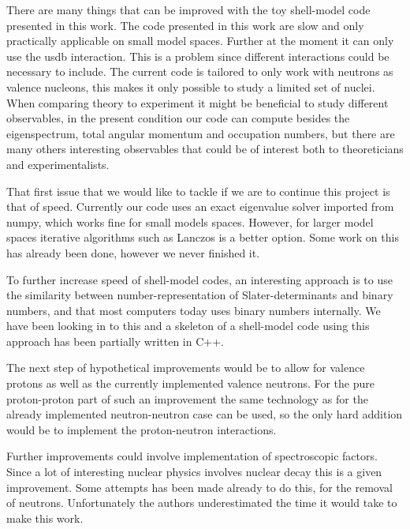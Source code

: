 There are many things that can be improved with the toy shell-model code presented in this work. The code presented in this work are slow and only practically applicable on small model spaces. Further at the moment it can only use the usdb interaction. This is a problem since different interactions could be necessary to include. The current code is tailored to only work with neutrons as valence nucleons, this makes it only possible to study a limited set of nuclei. When comparing theory to experiment it might be beneficial to study different observables, in the present condition our code can compute besides the eigenspectrum, total angular momentum and occupation numbers, but there are many others interesting observables that could be of interest both to theoreticians and experimentalists.

That first issue that we would like to tackle if we are to continue this project is that of speed.
Currently our code uses an exact eigenvalue solver imported from numpy, which works fine for small models spaces. However, for larger model spaces iterative algorithms such as Lanczos is a better option. Some work on this has already been done, however we never finished it.

To further increase speed of shell-model codes, an interesting approach is to use the similarity between number-representation of Slater-determinants and binary numbers, and that most computers today uses binary numbers internally. We have been looking in to this and a skeleton of a shell-model code using this approach has been partially written in C++.

The next step of hypothetical improvements would be to allow for valence protons as well as the currently implemented valence neutrons. For the pure proton-proton part of such an improvement the same technology as for the already implemented neutron-neutron case can be used, so the only hard addition would be to implement the proton-neutron interactions.

Further improvements could involve implementation of spectroscopic factors. Since a lot of interesting nuclear physics involves nuclear decay this is a given improvement. Some attempts has been made already to do this, for the removal of neutrons. Unfortunately the authors underestimated the time it would take to make this work.

